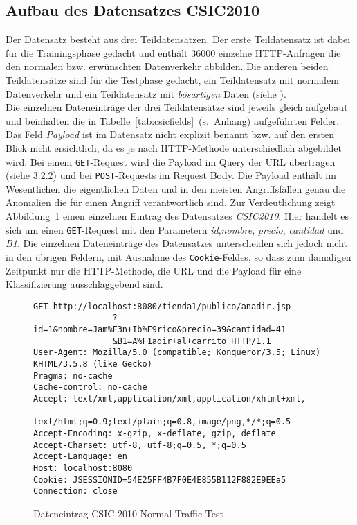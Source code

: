 %

\subsection{Aufbau des Datensatzes CSIC2010}


Der Datensatz besteht aus drei Teildatensätzen. Der erste Teildatensatz ist dabei für die Trainingsphase gedacht und enthält 36000 einzelne HTTP-Anfragen die den normalen bzw. erwünschten Datenverkehr abbilden. Die anderen beiden Teildatensätze sind für die Testphase gedacht, ein Teildatensatz mit normalem Datenverkehr und ein Teildatensatz mit \emph{bösartigen} Daten (siehe \cite{csic2010}).\\ Die einzelnen Dateneinträge der drei Teildatensätze sind jeweils gleich aufgebaut und beinhalten die in Tabelle~\ref{tab:csicfields}~(s.~Anhang) aufgeführten Felder. Das Feld \emph{Payload} ist im Datensatz nicht explizit benannt bzw. auf den ersten Blick nicht ersichtlich, da es je nach HTTP-Methode unterschiedlich abgebildet wird. Bei einem \verb=GET=-Request wird die Payload im Query der URL übertragen (siehe \cite{rfc2626} 3.2.2) und bei \verb=POST=-Requests im Request Body. Die Payload enthält im Wesentlichen die eigentlichen Daten und in den meisten Angriffsfällen genau die Anomalien die für einen Angriff verantwortlich sind. Zur Verdeutlichung zeigt Abbildung~\ref{fig:ccex} einen einzelnen Eintrag des Datensatzes \emph{CSIC2010}. Hier handelt es sich um einen \verb=GET=-Request mit den Parametern \emph{id},\emph{nombre}, \emph{precio}, \emph{cantidad} und \emph{B1}. Die einzelnen Dateneinträge des Datensatzes unterscheiden sich jedoch nicht in den übrigen Feldern, mit Ausnahme des \verb=Cookie=-Feldes, so dass zum damaligen Zeitpunkt nur die HTTP-Methode, die URL und die Payload für eine Klassifizierung ausschlaggebend sind.


\begin{figure}[h]
  \centering
        \caption{Dateneintrag CSIC 2010 Normal Traffic Test}
        \label{fig:ccex}
        \begin{lstlisting}[basicstyle=\footnotesize]
GET http://localhost:8080/tienda1/publico/anadir.jsp
                ?id=1&nombre=Jam%F3n+Ib%E9rico&precio=39&cantidad=41
                &B1=A%F1adir+al+carrito HTTP/1.1
User-Agent: Mozilla/5.0 (compatible; Konqueror/3.5; Linux) KHTML/3.5.8 (like Gecko)
Pragma: no-cache
Cache-control: no-cache
Accept: text/xml,application/xml,application/xhtml+xml,
                text/html;q=0.9;text/plain;q=0.8,image/png,*/*;q=0.5
Accept-Encoding: x-gzip, x-deflate, gzip, deflate
Accept-Charset: utf-8, utf-8;q=0.5, *;q=0.5
Accept-Language: en
Host: localhost:8080
Cookie: JSESSIONID=54E25FF4B7F0E4E855B112F882E9EEa5
Connection: close
\end{lstlisting}
\end{figure}

